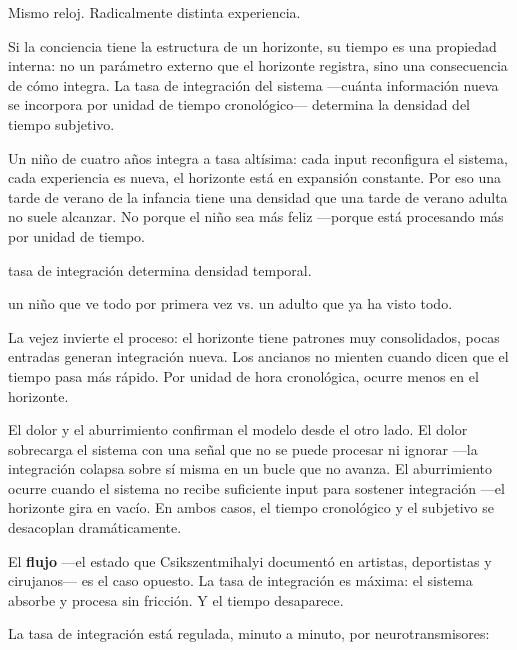 Mismo reloj. Radicalmente distinta experiencia.

\noindent Si la conciencia tiene la estructura de un horizonte, su tiempo es una propiedad interna: no un parámetro externo que el horizonte registra, sino una consecuencia de cómo integra. La tasa de integración del sistema —cuánta información nueva se incorpora por unidad de tiempo cronológico— determina la densidad del tiempo subjetivo.

Un niño de cuatro años integra a tasa altísima: cada input reconfigura el sistema, cada experiencia es nueva, el horizonte está en expansión constante. Por eso una tarde de verano de la infancia tiene una densidad que una tarde de verano adulta no suele alcanzar. No porque el niño sea más feliz —porque está procesando más por unidad de tiempo.

\begin{fisica}
 tasa de integración determina densidad temporal.

 un niño que ve todo por primera vez vs. un adulto que ya ha visto todo.
\end{fisica}
La vejez invierte el proceso: el horizonte tiene patrones muy consolidados, pocas entradas generan integración nueva. Los ancianos no mienten cuando dicen que el tiempo pasa más rápido. Por unidad de hora cronológica, ocurre menos en el horizonte.

El dolor y el aburrimiento confirman el modelo desde el otro lado. El dolor sobrecarga el sistema con una señal que no se puede procesar ni ignorar —la integración colapsa sobre sí misma en un bucle que no avanza. El aburrimiento ocurre cuando el sistema no recibe suficiente input para sostener integración —el horizonte gira en vacío. En ambos casos, el tiempo cronológico y el subjetivo se desacoplan dramáticamente.

El \textbf{flujo} —el estado que Csikszentmihalyi documentó en artistas, deportistas y cirujanos— es el caso opuesto. La tasa de integración es máxima: el sistema absorbe y procesa sin fricción. Y el tiempo desaparece.

\noindent La tasa de integración está regulada, minuto a minuto, por neurotransmisores:

